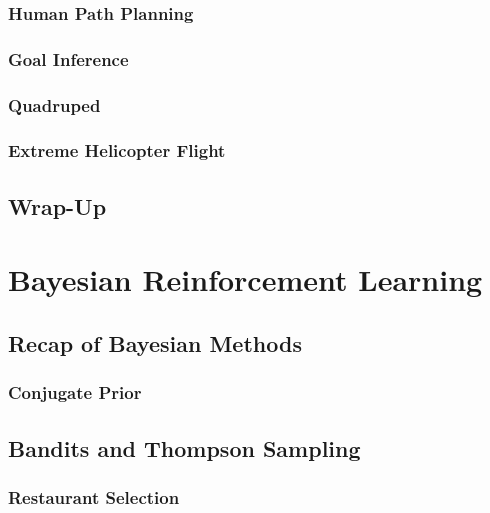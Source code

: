 		\subsection{Human Path Planning} %

		\subsection{Goal Inference} %

		\subsection{Quadruped} %

		\subsection{Extreme Helicopter Flight} %

	\section{Wrap-Up} %

\chapter{Bayesian Reinforcement Learning} %

	\section{Recap of Bayesian Methods} %

		\subsection{Conjugate Prior} %

	\section{Bandits and Thompson Sampling} %

		\subsection{Restaurant Selection} %

